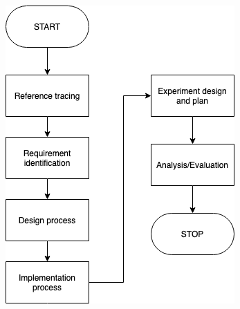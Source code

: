 \begin{figure}[H]
	\centering
	\includegraphics[width=0.7\linewidth]{figure/Metode-Penelitian-flow.png}
	\caption[Metode Penelitian]{}
	\label{fig:metode-penelitian-flow}
\end{figure}



